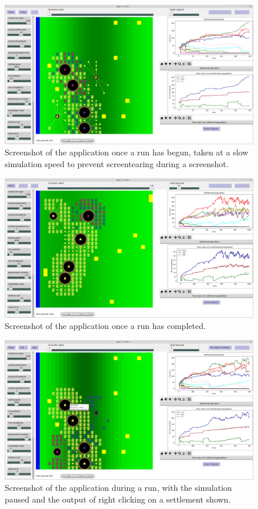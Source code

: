 \documentclass[12pt]{article}
\begin{document}
	\begin{figure}[!htb]
		\includegraphics[width=15cm]{WhileRunning}
		\caption{Screenshot of the application once a run has begun, taken at a slow simulation speed to prevent screentearing during a screenshot.}
		\label{fig:WhileRunning}
	\end{figure}
	
	\begin{figure}[!htb]
		\includegraphics[width=15cm]{FinishedRunning}
		\caption{Screenshot of the application once a run has completed.}
		\label{fig:FinishedRunning}
	\end{figure}
	
	\begin{figure}[!htb]
		\includegraphics[width=15cm]{RightClickOnSettlement}
		\caption{Screenshot of the application during a run, with the simulation paused and the output of right clicking on a settlement shown.}
		\label{fig:ClickOnSettlement}
	\end{figure}
	
\end{document}
